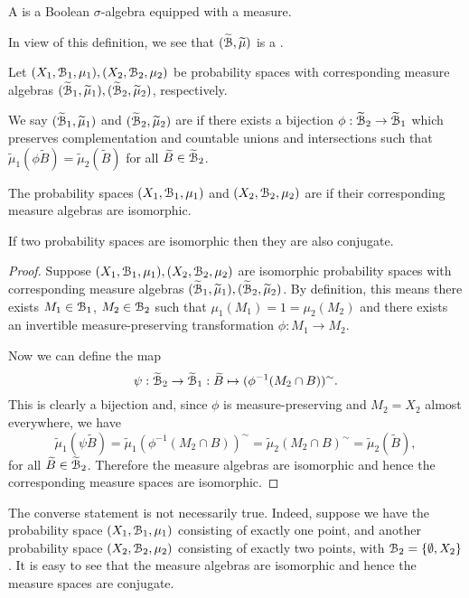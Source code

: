 \begin{definition}
	A  is a Boolean $\sigma$-algebra equipped with a measure.
\end{definition}

In view of this definition, we see that $(\widetilde{\mathcal{B}}, \widetilde{\mu})$ is a .

\begin{definition}
	Let $(X_1, \mathcal{B}_1, \mu_1), (X_2, \mathcal{B}_2, \mu_2)$ be probability spaces with corresponding measure algebras $(\widetilde{\mathcal{B}}_1, \widetilde{\mu}_1), (\widetilde{\mathcal{B}}_2, \widetilde{\mu}_2)$, respectively.
	
	We say $(\widetilde{\mathcal{B}}_1, \widetilde{\mu}_1)$ and $(\widetilde{\mathcal{B}}_2, \widetilde{\mu}_2)$ are  if there exists a bijection $\phi : \widetilde{\mathcal{B}}_2 \to \widetilde{\mathcal{B}}_1$ which preserves complementation and countable unions and intersections such that $\tilde{\mu}_1(\phi \tilde{B}) = \tilde{\mu}_2(\tilde{B})$ for all $\widetilde{B} \in \widetilde{\mathcal{B}}_2$.
	
	The probability spaces $(X_1, \mathcal{B}_1, \mu_1)$ and $(X_2, \mathcal{B}_2, \mu_2)$ are  if their corresponding measure algebras are isomorphic.
\end{definition}

\begin{proposition}
	If two probability spaces are isomorphic then they are also conjugate.
	\begin{proof}
		Suppose $(X_1, \mathcal{B}_1, \mu_1), (X_2, \mathcal{B}_2, \mu_2)$ are isomorphic probability spaces with corresponding measure algebras $(\widetilde{\mathcal{B}}_1, \widetilde{\mu}_1), (\widetilde{\mathcal{B}}_2, \widetilde{\mu}_2)$. By definition, this means there exists $M_1 \in \mathcal{B}_1$, $M_2 \in \mathcal{B}_2$ such that $\mu_1(M_1) = 1 = \mu_2(M_2)$ and there exists an invertible measure-preserving transformation $\phi: M_1 \to M_2$.
		
		Now we can define the map
		\[
			\psi : \widetilde{\mathcal{B}}_2 \to \widetilde{\mathcal{B}}_1 : \widetilde{B} \mapsto (\phi^{-1}(M_2 \cap B))^\sim.
		\]
		This is clearly a bijection and, since $\phi$ is measure-preserving and $M_2 = X_2$ almost everywhere, we have
		\[
			\tilde{\mu}_1(\psi\tilde{B}) = \tilde{\mu}_1(\phi^{-1}(M_2 \cap B))^\sim = \tilde{\mu}_2(M_2 \cap B)^\sim = \tilde{\mu}_2(\tilde{B}),
		\]
		for all $\widetilde{B} \in \widetilde{\mathcal{B}}_2$. Therefore the measure algebras are isomorphic and hence the corresponding measure spaces are isomorphic.
	\end{proof}
\end{proposition}

The converse statement is not necessarily true. Indeed, suppose we have the probability space $(X_1, \mathcal{B}_1, \mu_1)$ consisting of exactly one point, and another probability space $(X_2, \mathcal{B}_2, \mu_2)$ consisting of exactly two points, with $\mathcal{B}_2 = \{\emptyset, X_2\}$. It is easy to see that the measure algebras are isomorphic and hence the measure spaces are conjugate.

